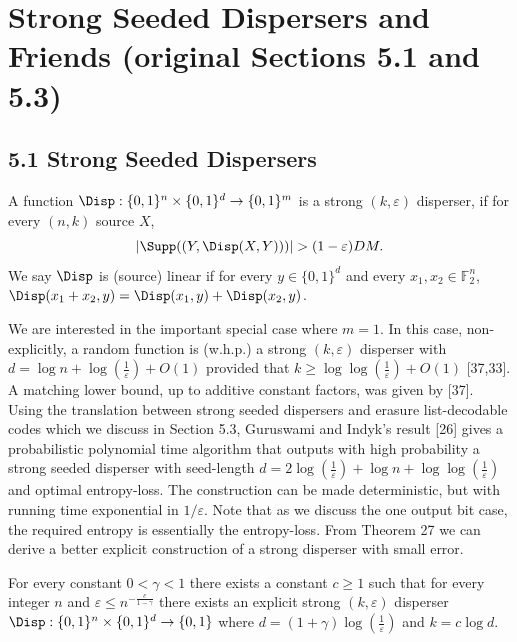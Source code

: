\section*{Strong Seeded Dispersers and Friends (original Sections 5.1 and 5.3)}
\subsection*{5.1 Strong Seeded Dispersers}
\begin{definition}
A function $\Disp:\{0,1\}^n\times\{0,1\}^d\to\{0,1\}^m$ is a strong $(k,\varepsilon)$ disperser, if for every $(n,k)$ source $X$,
\[|\Supp((Y,\Disp(X,Y)))|>(1-\varepsilon)DM.\]
We say $\Disp$ is (source) linear if for every $y\in\{0,1\}^d$ and every $x_1,x_2\in\mathbb F_2^n$, $\Disp(x_1+x_2,y)=\Disp(x_1,y)+\Disp(x_2,y)$.
\end{definition}
We are interested in the important special case where $m=1$. In this case, non-explicitly, a random function is (w.h.p.) a strong $(k,\varepsilon)$ disperser with $d=\log n+\log(\frac1\varepsilon)+O(1)$ provided that $k\ge\log\log(\frac1\varepsilon)+O(1)$ [37,33]. A matching lower bound, up to additive constant factors, was given by [37].
Using the translation between strong seeded dispersers and erasure list-decodable codes which we discuss in Section 5.3, Guruswami and Indyk's result [26] gives a probabilistic polynomial time algorithm that outputs with high probability a strong seeded disperser with seed-length $d=2\log(\frac1\varepsilon)+\log n+\log\log(\frac1\varepsilon)$ and optimal entropy-loss. The construction can be made deterministic, but with running time exponential in $1/\varepsilon$.
Note that as we discuss the one output bit case, the required entropy is essentially the entropy-loss. From Theorem 27 we can derive a better explicit construction of a strong disperser with small error.
\begin{theorem}
For every constant $0<\gamma<1$ there exists a constant $c\ge1$ such that for every integer $n$ and $\varepsilon\le n^{-\frac c{1-\gamma}}$ there exists an explicit strong $(k,\varepsilon)$ disperser $\Disp:\{0,1\}^n\times\{0,1\}^d\to\{0,1\}$ where $d=(1+\gamma)\log(\frac1\varepsilon)$ and $k=c\log d$.
\end{theorem}
